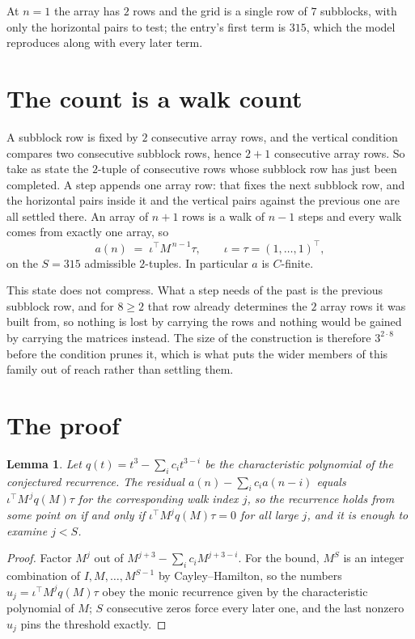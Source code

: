 \documentclass[11pt,a4paper]{article}
\theoremstyle{plain}
\newtheorem{lemma}[theorem]{Lemma}
\theoremstyle{definition}
\begin{document}
At $n=1$ the array has $2$ rows and the grid is a single row of $7$
subblocks, with only the horizontal pairs to test; the entry's first term is
$315$, which the model reproduces along with every later term.

\section{The count is a walk count}

A subblock row is fixed by $2$ consecutive array rows, and the vertical condition compares
two consecutive subblock rows, hence $2+1$ consecutive array rows. So take as state the
$2$-tuple of consecutive rows whose subblock row has just been completed. A step appends one
array row: that fixes the next subblock row, and the horizontal pairs inside it and the
vertical pairs against the previous one are all settled there. An array of $n+1$ rows is
a walk of $n-1$ steps and every walk comes from exactly one array, so
\[
a(n)\;=\;\iota^{\!\top}M^{\,n-1}\tau,\qquad\iota=\tau=(1,\dots,1)^{\!\top},
\]
on the $S=315$ admissible $2$-tuples. In particular $a$ is $C$-finite.

This state does not compress. What a step needs of the past is the previous subblock row, and
for $8\ge2$ that row already determines the $2$ array rows it was built from, so nothing
is lost by carrying the rows and nothing would be gained by carrying the matrices instead. The
size of the construction is therefore $3^{2\cdot8}$ before the condition prunes
it, which is what puts the wider members of this family out of reach rather than settling them.

\section{The proof}

\begin{lemma}\label{lem:crit}
Let $q(t)=t^{3}-\sum_i c_it^{3-i}$ be the characteristic polynomial of the
conjectured recurrence. The residual $a(n)-\sum_ic_ia(n-i)$ equals
$\iota^{\!\top}M^{\,j}q(M)\tau$ for the corresponding walk index $j$, so the recurrence
holds from some point on if and only if $\iota^{\!\top}M^{j}q(M)\tau=0$ for all large $j$,
and it is enough to examine $j<S$.
\end{lemma}

\begin{proof}
Factor $M^{j}$ out of $M^{j+3}-\sum_ic_iM^{j+3-i}$. For the bound, $M^{S}$
is an integer combination of $I,M,\dots,M^{S-1}$ by Cayley--Hamilton, so the numbers
$u_j=\iota^{\!\top}M^{j}q(M)\tau$ obey the monic recurrence given by the characteristic
polynomial of $M$; $S$ consecutive zeros force every later one, and the last nonzero $u_j$
pins the threshold exactly.
\end{proof}
\end{document}
